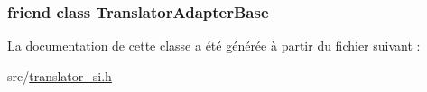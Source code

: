 \subsubsection[{Translator\+Adapter\+Base}]{\setlength{\rightskip}{0pt plus 5cm}friend class {\bf Translator\+Adapter\+Base}\hspace{0.3cm}{\ttfamily [friend]}}\label{class_translator_slovene_a6a27329ec4f8a11907f075e9052d96f7}


La documentation de cette classe a été générée à partir du fichier suivant \+:\begin{DoxyCompactItemize}
\item 
src/\hyperlink{translator__si_8h}{translator\+\_\+si.\+h}\end{DoxyCompactItemize}
